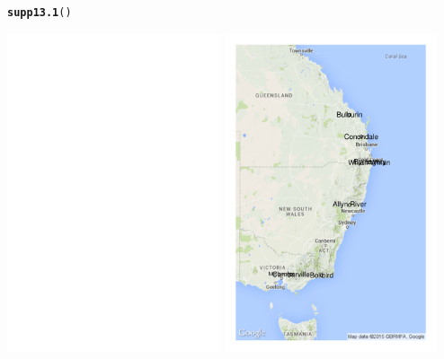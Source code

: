 \documentclass[12pt, a4paper,  BCOR=8.25mm, DIV=15]{scrartcl}\usepackage[]{graphicx}\usepackage[]{color}
\makeatletter
\newcommand{\hlstd}[1]{\textcolor[rgb]{0.345,0.345,0.345}{#1}}%
\newcommand{\hlkwd}[1]{\textcolor[rgb]{0.737,0.353,0.396}{\textbf{#1}}}%
\newenvironment{kframe}{%
 \def\at@end@of@kframe{}%
 \ifinner\ifhmode%
  \def\at@end@of@kframe{\end{minipage}}%
  \begin{minipage}{\columnwidth}%
 \fi\fi%
 \def\FrameCommand##1{\hskip\@totalleftmargin \hskip-\fboxsep
 \colorbox{shadecolor}{##1}\hskip-\fboxsep
     \hskip-\linewidth \hskip-\@totalleftmargin \hskip\columnwidth}%
 \MakeFramed {\advance\hsize-\width
   \@totalleftmargin\z@ \linewidth\hsize
   \@setminipage}}%
 {\par\unskip\endMakeFramed%
 \at@end@of@kframe}
\newenvironment{knitrout}{}{} %
\makeatother
\begin{document}
\begin{suppfigure}
\begin{knitrout}
\color{fgcolor}\begin{kframe}
\begin{alltt}
\hlkwd{supp13.1}\hlstd{()}
\end{alltt}
\end{kframe}

{\centering \includegraphics[width=0.47\textwidth]{figs/map-google-possums-13_1-1} 
\includegraphics[width=0.47\textwidth]{figs/map-google-possums-13_1-2} 

}



\end{knitrout}
\end{suppfigure}
\end{document}

